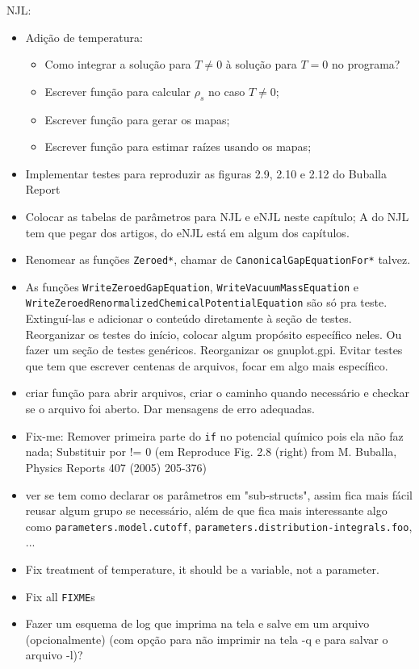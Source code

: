 NJL:
\begin{itemize}
	\item Adição de temperatura:
		\begin{itemize}
			\item Como integrar a solução para $T \neq 0$ à solução para $T = 0$ no programa?
			\item Escrever função para calcular $\rho_s$ no caso $T \neq 0$;
			\item Escrever função para gerar os mapas;
			\item Escrever função para estimar raízes usando os mapas;
		\end{itemize}
	\item Implementar testes para reproduzir as figuras 2.9, 2.10 e 2.12 do Buballa Report
	\item Colocar as tabelas de parâmetros para NJL e eNJL neste capítulo; A do NJL tem que pegar dos artigos, do eNJL está em algum dos capítulos.
	\item Renomear as funções \texttt{Zeroed*}, chamar de \texttt{CanonicalGapEquationFor*} talvez.
	\item As funções \texttt{WriteZeroedGapEquation}, \texttt{WriteVacuumMassEquation} e \texttt{WriteZeroedRenormalizedChemicalPotentialEquation} são só pra teste. Extinguí-las e adicionar o conteúdo diretamente à seção de testes. Reorganizar os testes do início, colocar algum propósito específico neles. Ou fazer um seção de testes genéricos. Reorganizar os gnuplot.gpi. Evitar testes que tem que escrever centenas de arquivos, focar em algo mais específico.
	\item criar função para abrir arquivos, criar o caminho quando necessário e checkar se o arquivo foi aberto. Dar mensagens de erro adequadas.
	\item Fix-me: Remover primeira parte do \texttt{if} no potencial químico pois ela não faz nada; Substituir por != 0 (em Reproduce Fig. 2.8 (right) from  M. Buballa, Physics Reports 407 (2005) 205-376)
	\item ver se tem como declarar os parâmetros em "sub-structs", assim fica mais fácil reusar algum grupo se necessário, além de que fica mais interessante algo como \texttt{parameters.model.cutoff}, \texttt{parameters.distribution-integrals.foo}, ...
	\item Fix treatment of temperature, it should be a variable, not a parameter.
	\item Fix all \texttt{FIXME}s
	\item Fazer um esquema de log que imprima na tela e salve em um arquivo (opcionalmente) (com opção para não imprimir na tela -q e para salvar o arquivo -l)?

\end{itemize}
